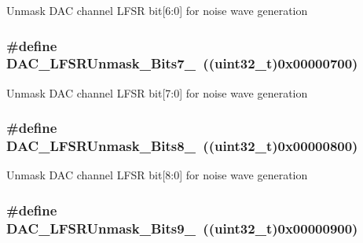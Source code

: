 Unmask DAC channel LFSR bit\mbox{[}6:0\mbox{]} for noise wave generation \hypertarget{group__DAC__lfsrunmask__triangleamplitude_gaf0a93c1ee1e13776fae7558b36243431}{
\subsubsection[{DAC\_\-LFSRUnmask\_\-Bits7\_\-0}]{\setlength{\rightskip}{0pt plus 5cm}\#define DAC\_\-LFSRUnmask\_\-Bits7\_~((uint32\_\-t)0x00000700)}}
\label{group__DAC__lfsrunmask__triangleamplitude_gaf0a93c1ee1e13776fae7558b36243431}
Unmask DAC channel LFSR bit\mbox{[}7:0\mbox{]} for noise wave generation \hypertarget{group__DAC__lfsrunmask__triangleamplitude_ga4f56965841d9d91ca5b6de43ee589598}{
\subsubsection[{DAC\_\-LFSRUnmask\_\-Bits8\_\-0}]{\setlength{\rightskip}{0pt plus 5cm}\#define DAC\_\-LFSRUnmask\_\-Bits8\_~((uint32\_\-t)0x00000800)}}
\label{group__DAC__lfsrunmask__triangleamplitude_ga4f56965841d9d91ca5b6de43ee589598}
Unmask DAC channel LFSR bit\mbox{[}8:0\mbox{]} for noise wave generation \hypertarget{group__DAC__lfsrunmask__triangleamplitude_gaf7f4540d9ec6efe074e1e4485f9a347a}{
\subsubsection[{DAC\_\-LFSRUnmask\_\-Bits9\_\-0}]{\setlength{\rightskip}{0pt plus 5cm}\#define DAC\_\-LFSRUnmask\_\-Bits9\_~((uint32\_\-t)0x00000900)}}
\label{group__DAC__lfsrunmask__triangleamplitude_gaf7f4540d9ec6efe074e1e4485f9a347a}
